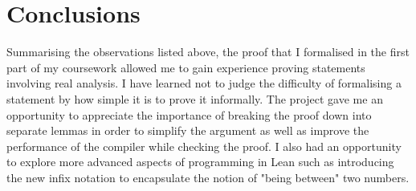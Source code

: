 \documentclass[11pt]{article}
\begin{document}
\section*{Conclusions}
Summarising the observations listed above, the proof that I formalised in the
first part of my coursework allowed me to gain experience proving statements
involving real analysis. I have learned not to judge the difficulty of
formalising a statement by how simple it is to prove it informally. The project
gave me an opportunity to appreciate the importance of breaking the proof down
into separate lemmas in order to simplify the argument as well as improve the
performance of the compiler while checking the proof. I also had an opportunity
to explore more advanced aspects of programming in Lean such as introducing the
new infix notation to encapsulate the notion of "being between" two numbers.
\end{document}
